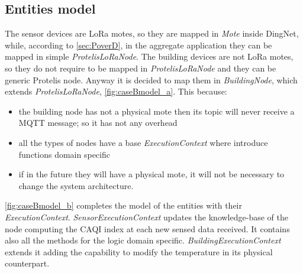 \subsection*{Entities model}
The sensor devices are LoRa motes, so they are mapped in \mbox{\textit{Mote}} inside DingNet, while, according to \cref{sec:PoverD}, in the aggregate application they can be mapped in simple \mbox{\textit{ProtelisLoRaNode}}.
The building devices are not LoRa motes, so they do not require to be mapped in \mbox{\textit{ProtelisLoRaNode}} and they can be generic Protelis node.
Anyway it is decided to map them in \mbox{\textit{BuildingNode}}, which extends \mbox{\textit{ProtelisLoRaNode}}, \autoref{fig:caseBmodel_a}. This because:
\begin{itemize}
    \item the building node has not a physical mote then its topic will never receive a MQTT message; so it has not any overhead
    \item all the types of nodes have a base \mbox{\textit{ExecutionContext}} where introduce functions domain specific
    \item if in the future they will have a physical mote, it will not be necessary to change the system architecture.
\end{itemize}
\autoref{fig:caseBmodel_b} completes the model of the entities with their \mbox{\textit{ExecutionContext}}.
\mbox{\textit{SensorExecutionContext}} updates the knowledge-base of the node computing the CAQI index at each new sensed data received. It contains also all the methods for the logic domain specific. \mbox{\textit{BuildingExecutionContext}} extends it adding the capability to modify the temperature in its physical counterpart.
